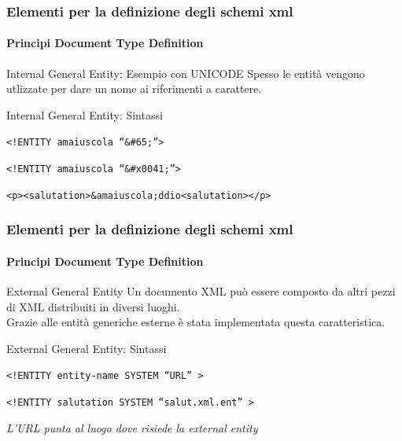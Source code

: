 \begin{frame}
    \frametitle{Elementi per la definizione degli schemi xml}
    \framesubtitle{Principi Document Type Definition}
    \addtocounter{nframe}{1}

    \begin{block}{Internal General Entity: Esempio con UNICODE}
        Spesso le entità vengono utlizzate per dare un nome ai riferimenti a carattere.
    \end{block}

    \begin{block}{Internal General Entity: Sintassi}
    \begin{center}\texttt{<!ENTITY amaiuscola ``\&\#65;''>}\end{center}
    \begin{center}\texttt{<!ENTITY amaiuscola ``\&\#x0041;''>}\end{center}
    \begin{center}\texttt{<p><salutation>\&amaiuscola;ddio<salutation></p>}\end{center}
    \end{block}

\end{frame}

\begin{frame}
    \frametitle{Elementi per la definizione degli schemi xml}
    \framesubtitle{Principi Document Type Definition}
    \addtocounter{nframe}{1}

    \begin{block}{External General Entity}
        Un documento XML può essere composto da altri pezzi di XML distribuiti in diversi luoghi. 
        \\Grazie alle entità generiche esterne è stata implementata questa caratteristica.
    \end{block}

    \begin{block}{External General Entity: Sintassi}
    \begin{center}\texttt{<!ENTITY entity-name SYSTEM ``URL'' >}\end{center}
    \begin{center}\texttt{<!ENTITY salutation SYSTEM ``salut.xml.ent'' >}\end{center}
    \end{block}
    \textit{L'URL punta al luogo dove risiede la external entity}
\end{frame}


